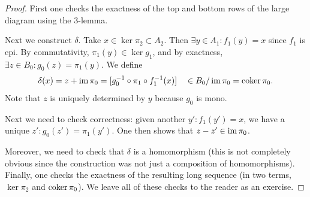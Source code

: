 \begin{lem}
\end{lem}
\begin{proof}
    First one checks the exactness of the top and bottom rows of the large diagram using the 3-lemma.
    
    Next we construct $\delta$. Take $x\in \ker\pi_2\subset A_2$. Then $\exists y\in A_1:f_1(y)=x$ since $f_1$ is epi. By commutativity, $\pi_1(y)\in\ker g_1$, and by exactness, $\exists z\in B_0:g_0(z)=\pi_1(y)$. We define
    \[\delta(x)=z+\operatorname{im} \pi_0=[g_0^{-1}\circ\pi_1\circ f_1^{-1}(x)]\quad \in B_0/\operatorname{im}\pi_0=\operatorname{coker}\pi_0.\]
    Note that $z$ is uniquely determined by $y$ because $g_0$ is mono.
    
    Next we need to check correctness: given another $y': f_1(y')=x$, we have a unique $z':g_0(z')=\pi_1(y')$. One then shows that $z-z'\in \operatorname{im}\pi_0$.
    
    Moreover, we need to check that $\delta$ is a homomorphism (this is not completely obvious since the construction was not just a composition of homomorphisms). Finally, one checks the exactness of the resulting long sequence (in two terms, $\ker\pi_2$ and $\operatorname{coker}\pi_0$). We leave all of these checks to the reader as an exercise.
\end{proof}


